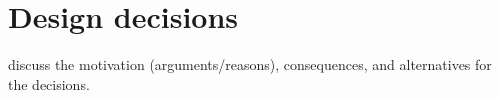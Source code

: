 \section{Design decisions}

discuss the motivation (arguments/reasons), consequences,
and alternatives for the decisions.